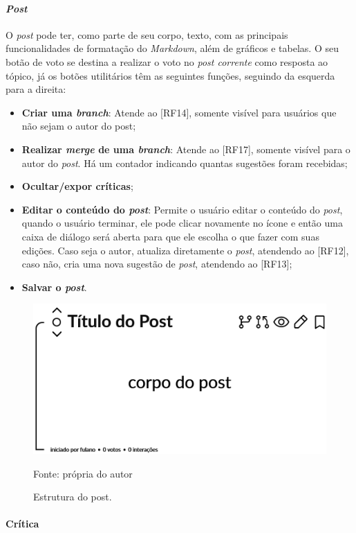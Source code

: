 \paragraph{\textit{Post}}

O \textit{post} pode ter, como parte de seu corpo, texto, com as principais funcionalidades de formatação do \textit{Markdown}, além de gráficos e tabelas. O seu botão de voto se destina a realizar o voto no \textit{post corrente} como resposta ao tópico, já os botões utilitários têm as seguintes funções, seguindo da esquerda para a direita:
\begin{itemize}
    \item \textbf{Criar uma \textit{branch}}: Atende ao [RF14], somente visível para usuários que não sejam o autor do post;
    \item \textbf{Realizar \textit{merge} de uma \textit{branch}}: Atende ao [RF17], somente visível para o autor do \textit{post}. Há um contador indicando quantas sugestões foram recebidas;
    \item \textbf{Ocultar/expor críticas};
    \item \textbf{Editar o conteúdo do \textit{post}}: Permite o usuário editar o conteúdo do \textit{post}, quando o usuário terminar, ele pode clicar novamente no ícone e então uma caixa de diálogo será aberta para que ele escolha o que fazer com suas edições. Caso seja o autor, atualiza diretamente o \textit{post}, atendendo ao [RF12], caso não, cria uma nova sugestão de \textit{post}, atendendo ao [RF13];
    \item \textbf{Salvar o \textit{post}}.
\end{itemize}

\begin{figure}[hbt!]
\centering
\includegraphics[width=0.7\linewidth]{imagens/structure/post.png}
\caption{Estrutura do post.}
Fonte: própria do autor
\label{fig:post}
\end{figure}



\paragraph{Crítica}

